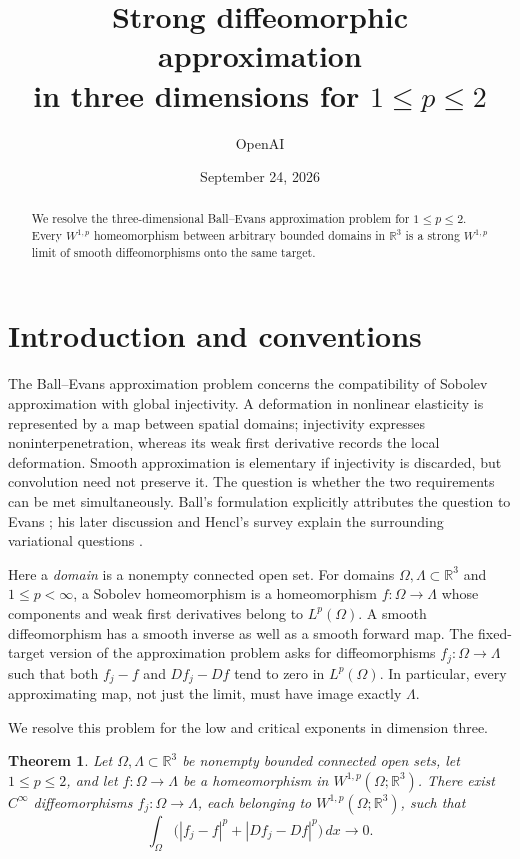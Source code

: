 \documentclass[11pt]{article}
\title{Strong diffeomorphic approximation\\in three dimensions for $1\le p\le2$}
\author{OpenAI}
\date{September 24, 2026}
\numberwithin{equation}{section}
\newtheorem{theorem}{Theorem}[section]
\theoremstyle{definition}
\theoremstyle{remark}
\newcommand{\R}{\mathbb R}
\begin{document}
\maketitle
\begin{abstract}
We resolve the three-dimensional Ball--Evans approximation problem for
$1\le p\le2$. Every $W^{1,p}$ homeomorphism between arbitrary bounded domains
in $\R^3$ is a strong $W^{1,p}$ limit of smooth diffeomorphisms onto the same
target.
\end{abstract}
\section{Introduction and conventions}\label{sec:introduction}

The Ball--Evans approximation problem concerns the compatibility of
Sobolev approximation with global injectivity. A deformation in nonlinear
elasticity is represented by a map between spatial domains; injectivity
expresses noninterpenetration, whereas its weak first derivative records
the local deformation. Smooth approximation is elementary if injectivity
is discarded, but convolution need not preserve it. The question is
whether the two requirements can be met simultaneously. Ball's
formulation explicitly attributes the question to Evans
\cite[Section~3, p.~8]{Ball2001}; his later discussion and Hencl's survey
explain the surrounding variational questions
\cite{Ball2010,Hencl2025}.

Here a \emph{domain} is a nonempty connected open set. For domains
$\Omega,\Lambda\subset\R^3$ and $1\le p<\infty$, a Sobolev
homeomorphism is a homeomorphism $f:\Omega\to\Lambda$ whose components
and weak first derivatives belong to $L^p(\Omega)$. A smooth
diffeomorphism has a smooth inverse as well as a smooth forward map.
The fixed-target version of the approximation problem asks for
diffeomorphisms $f_j:\Omega\to\Lambda$ such that both $f_j-f$ and
$Df_j-Df$ tend to zero in $L^p(\Omega)$. In particular, every
approximating map, not just the limit, must have image exactly
$\Lambda$.

We resolve this problem for the low and critical exponents in dimension
three.

\begin{theorem}\label{main:theorem}
Let $\Omega,\Lambda\subset\R^3$ be nonempty bounded connected open sets, let $1\le p\le2$, and let $f:\Omega\to\Lambda$ be a homeomorphism in $W^{1,p}(\Omega;\R^3)$. There exist $C^\infty$ diffeomorphisms $f_j:\Omega\to\Lambda$, each belonging to $W^{1,p}(\Omega;\R^3)$, such that
\begin{equation}\label{main:convergence}
\int_\Omega\bigl( |f_j-f|^p+|Df_j-Df|^p\bigr)\,dx\longrightarrow0.
\end{equation}
\end{theorem}
\end{document}
